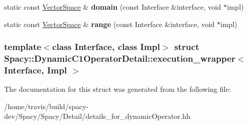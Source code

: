 \begin{DoxyCompactItemize}
\item 
\hypertarget{structSpacy_1_1DynamicC1OperatorDetail_1_1execution__wrapper_ae07735382c9492250d934ba55386655e}{static const \hyperlink{classSpacy_1_1VectorSpace}{\-Vector\-Space} \& {\bfseries domain} (const \-Interface \&interface, void $\ast$impl)}\label{structSpacy_1_1DynamicC1OperatorDetail_1_1execution__wrapper_ae07735382c9492250d934ba55386655e}

\item 
\hypertarget{structSpacy_1_1DynamicC1OperatorDetail_1_1execution__wrapper_a12ca2ec1879d840bf57eb05e1a20c014}{static const \hyperlink{classSpacy_1_1VectorSpace}{\-Vector\-Space} \& {\bfseries range} (const \-Interface \&interface, void $\ast$impl)}\label{structSpacy_1_1DynamicC1OperatorDetail_1_1execution__wrapper_a12ca2ec1879d840bf57eb05e1a20c014}

\end{DoxyCompactItemize}
\subsubsection*{template$<$class Interface, class Impl$>$ struct Spacy\-::\-Dynamic\-C1\-Operator\-Detail\-::execution\-\_\-wrapper$<$ Interface, Impl $>$}



\-The documentation for this struct was generated from the following file\-:\begin{DoxyCompactItemize}
\item 
/home/travis/build/spacy-\/dev/\-Spacy/\-Spacy/\-Detail/details\-\_\-for\-\_\-dynamic\-Operator.\-hh\end{DoxyCompactItemize}
